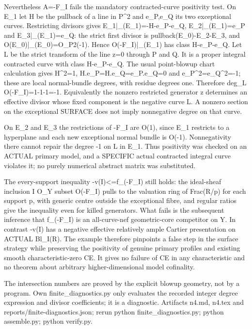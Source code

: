 Nevertheless A=-F\_I fails the mandatory contracted-curve positivity test. On E\_1 let H be the pullback of a line in P\textasciicircum{}2 and e\_P,e\_Q its two exceptional curves. Restricting divisors gives E\_1|\_(E\_1)=-H-e\_P-e\_Q, E\_2|\_(E\_1)=e\_P and E\_3|\_(E\_1)=e\_Q: the strict first divisor is pullback(E\_0)-E\_2-E\_3, and O(E\_0)|\_(E\_0)=O\_P2(-1). Hence
O(-F\_I)|\_(E\_1) has class H-e\_P-e\_Q.
Let L be the strict transform of the line z=0 through P and Q. It is a proper integral contracted curve with class H-e\_P-e\_Q. The usual point-blowup chart calculation gives H\textasciicircum{}2=1, H.e\_P=H.e\_Q=e\_P.e\_Q=0 and e\_P\textasciicircum{}2=e\_Q\textasciicircum{}2=-1; these are local normal-bundle degrees, with residue degrees one. Therefore deg\_L O(-F\_I)=1-1-1=-1. Equivalently the nonzero restricted generator z determines an effective divisor whose fixed component is the negative curve L. A nonzero section on the exceptional SURFACE does not imply nonnegative degree on that curve.

On E\_2 and E\_3 the restrictions of -F\_I are O(1), since E\_1 restricts to a hyperplane and each new exceptional normal bundle is O(-1). Nonnegativity there cannot repair the degree -1 on L in E\_1. Thus positivity was checked on an ACTUAL primary model, and a SPECIFIC actual contracted integral curve violates it; no purely numerical abstract matrix was substituted.

The every-support inequality -v(I)\textless{}=f\_(-F\_I) still holds: the ideal-sheaf inclusion I O\_Y subset O(-F\_I) pulls to the valuation ring of Frac(R/p) for each support p, with generic centre outside the exceptional fibre, and regular ratios give the inequality even for killed generators. What fails is the subsequent inference that f\_(-F\_I) is an all-curve-nef geometric-core competitor on Y. In contrast -v(I) has a negative effective relatively ample Cartier presentation on ACTUAL Bl\_I(R). The example therefore pinpoints a false step in the surface strategy while preserving the positivity of genuine primary profiles and existing smooth characteristic-zero CE. It gives no failure of CE in any characteristic and no theorem about arbitrary higher-dimensional model cofinality.

The intersection numbers are proved by the explicit blowup geometry, not by a program. Own finite\_diagnostics.py only evaluates the recorded integer degree expression and divisor coefficients; it is a diagnostic. Artifacts n4.md, n4.tex and reports/finite-diagnostics.json; rerun python finite\_diagnostics.py; python assemble.py; python verify.py.

